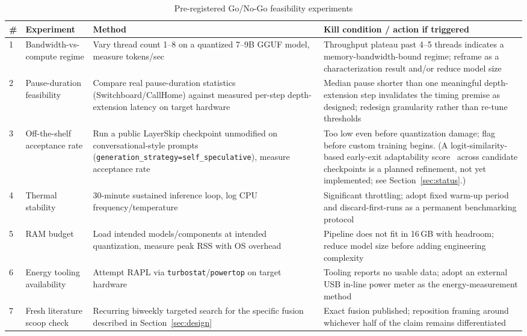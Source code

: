 \documentclass[journal]{IEEEtran}
\begin{document}
\begin{table}[t]
\centering
\caption{Pre-registered Go/No-Go feasibility experiments}
\label{tab:gonogo}
\begin{tabular}{@{}p{}p{}p{}p{}@{}}
\toprule
\textbf{\#} & \textbf{Experiment} & \textbf{Method} & \textbf{Kill condition / action if triggered} \\
\midrule
1 & Bandwidth-vs-compute regime & Vary thread count 1--8 on a quantized 7--9B GGUF model, measure tokens/sec & Throughput plateau past 4--5 threads indicates a memory-bandwidth-bound regime; reframe as a characterization result and/or reduce model size \\
2 & Pause-duration feasibility & Compare real pause-duration statistics (Switchboard/CallHome) against measured per-step depth-extension latency on target hardware & Median pause shorter than one meaningful depth-extension step invalidates the timing premise as designed; redesign granularity rather than re-tune thresholds \\
3 & Off-the-shelf acceptance rate & Run a public LayerSkip checkpoint unmodified on conversational-style prompts (\texttt{generation\_strategy=self\_speculative}), measure acceptance rate & Too low even before quantization damage; flag before custom training begins. (A logit-similarity-based early-exit adaptability score~\cite{wei2026diminishing} across candidate checkpoints is a planned refinement, not yet implemented; see Section~\ref{sec:status}.) \\
4 & Thermal stability & 30-minute sustained inference loop, log CPU frequency/temperature & Significant throttling; adopt fixed warm-up period and discard-first-runs as a permanent benchmarking protocol \\
5 & RAM budget & Load intended models/components at intended quantization, measure peak RSS with OS overhead & Pipeline does not fit in 16\,GB with headroom; reduce model size before adding engineering complexity \\
6 & Energy tooling availability & Attempt RAPL via \texttt{turbostat}/\texttt{powertop} on target hardware & Tooling reports no usable data; adopt an external USB in-line power meter as the energy-measurement method \\
7 & Fresh literature scoop check & Recurring biweekly targeted search for the specific fusion described in Section~\ref{sec:design} & Exact fusion published; reposition framing around whichever half of the claim remains differentiated \\
\bottomrule
\end{tabular}
\end{table}
\end{document}
